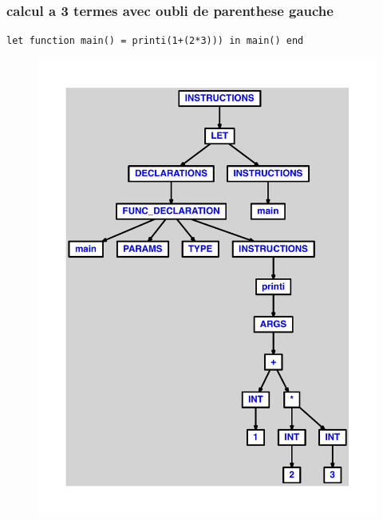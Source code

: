 \documentclass{article}
\begin{document}
\subsubsection{calcul a 3 termes avec oubli de parenthese gauche}
\begin{lstlisting}
let function main() = printi(1+(2*3))) in main() end
\end{lstlisting}
\newpage
\begin{figure}[H]
\centering
\includegraphics[max width=\textwidth]{ast/ast_29.pdf}
\end{figure}
\newpage
\end{document}
